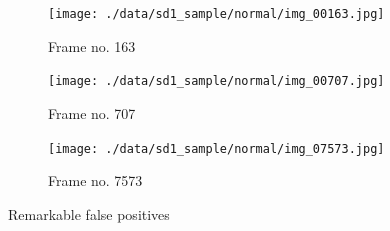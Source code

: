 \begin{figure}[!ht]
    \centering
    \begin{subfigure}{0.48\textwidth}
        \centering
        \texttt{[image: ./data/sd1\_sample/normal/img\_00163.jpg]}
        \caption*{Frame no. 163}
    \end{subfigure}
    \begin{subfigure}{0.48\textwidth}
        \centering
        \texttt{[image: ./data/sd1\_sample/normal/img\_00707.jpg]}
        \caption*{Frame no. 707}
    \end{subfigure}
    \begin{subfigure}{0.48\textwidth}
        \centering
        \texttt{[image: ./data/sd1\_sample/normal/img\_07573.jpg]}
        \caption*{Frame no. 7573}
    \end{subfigure}
    \caption{Remarkable false positives}
    \label{fig:false_positives}
\end{figure}